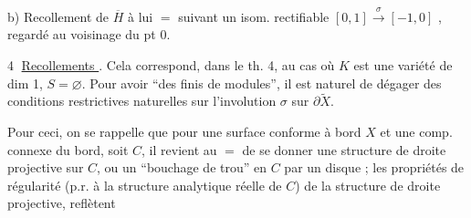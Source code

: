 
b) Recollement de $\overline H$ à lui $=$ suivant un isom. rectifiable $[0,1]\overset{\sigma}{\longrightarrow}[-1,0]$ , regardé au voisinage du pt 0.


\textcircled{4} \uline{Recollements  }.  Cela correspond, dans le th. 4, au cas où $K$ est une variété  de dim 1, $S=\varnothing$.  Pour avoir ``des  finis de modules'', il est naturel de dégager des conditions restrictives naturelles sur l'involution $\sigma$  sur $\partial\widetilde X$.

Pour ceci,  on se rappelle que pour une surface conforme à bord $X$  et une comp. connexe du bord, soit $C$, il revient au $=$ de se donner une structure de droite projective  sur $C$, ou un ``bouchage de trou'' en $C$ par un disque  ; les propriétés de régularité (p.r. à la structure analytique réelle de $C$) de la structure de droite projective, reflètent
